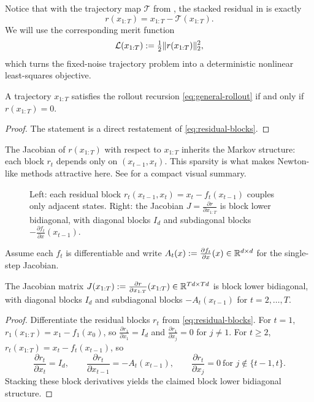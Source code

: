 \documentclass[11pt]{article}
\begin{document}
Notice that with the trajectory map $\mathcal{T}$ from , the stacked residual in  is exactly
\[
r(x_{1:T}) = x_{1:T}-\mathcal{T}(x_{1:T}).
\]
We will use the corresponding merit function
\[
  \mathcal{L}(x_{1:T}) := \tfrac12 \lVert r(x_{1:T})\rVert_2^2,
\]
which turns the fixed-noise trajectory problem into a deterministic nonlinear least-squares objective.

\begin{proposition}
\label{prop:residual-correctness}
A trajectory $x_{1:T}$ satisfies the rollout recursion \eqref{eq:general-rollout} if and only if $r(x_{1:T})=0$.
\end{proposition}

\begin{proof}
The statement is a direct restatement of \eqref{eq:residual-blocks}.
\end{proof}

The Jacobian of $r(x_{1:T})$ with respect to $x_{1:T}$ inherits the Markov structure: each block $r_t$ depends only on $(x_{t-1},x_t)$.
This sparsity is what makes Newton-like methods attractive here.
See  for a compact visual summary.

\begin{figure}[t]
  \centering
  \resizebox{\linewidth}{!}{}
  \caption{Left: each residual block $r_t(x_{t-1},x_t)=x_t-f_t(x_{t-1})$ couples only adjacent states.
  Right: the Jacobian $J=\frac{\partial r}{\partial x_{1:T}}$ is block lower bidiagonal, with diagonal blocks $I_d$ and subdiagonal blocks $-\frac{\partial f_t}{\partial x}(x_{t-1})$.}
  \label{fig:parallel-mcmc-residual-jacobian}
\end{figure}

Assume each $f_t$ is differentiable and write $A_t(x):=\frac{\partial f_t}{\partial x}(x)\in\mathbb{R}^{d\times d}$ for the single-step Jacobian.

\begin{proposition}
\label{prop:jacobian-structure}
The Jacobian matrix $J(x_{1:T}) := \frac{\partial r}{\partial x_{1:T}}(x_{1:T}) \in \mathbb{R}^{Td \times Td}$ is block lower bidiagonal, with diagonal blocks $I_d$ and subdiagonal blocks $-A_t(x_{t-1})$ for $t=2,\dots,T$.
\end{proposition}

\begin{proof}
Differentiate the residual blocks $r_t$ from \eqref{eq:residual-blocks}.
For $t=1$, $r_1(x_{1:T})=x_1-f_1(x_0)$, so $\frac{\partial r_1}{\partial x_1}=I_d$ and $\frac{\partial r_1}{\partial x_j}=0$ for $j\ne 1$.
For $t\ge 2$, $r_t(x_{1:T})=x_t-f_t(x_{t-1})$, so
\[
\frac{\partial r_t}{\partial x_t}=I_d,\qquad \frac{\partial r_t}{\partial x_{t-1}}=-A_t(x_{t-1}),\qquad \frac{\partial r_t}{\partial x_j}=0\ \text{for } j\notin\{t-1,t\}.
\]
Stacking these block derivatives yields the claimed block lower bidiagonal structure.%
\end{proof}
\end{document}
